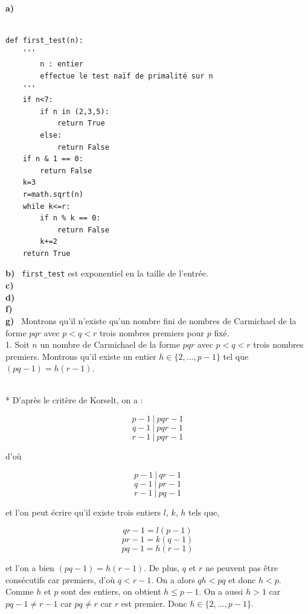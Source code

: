 \documentclass[a4paper]{article}
\newcommand{\question}[1]{\noindent \textbf{#1}~}
\newenvironment{myproof}[1][\proofname]{\proof[#1]\mbox{}\\*}{\endproof}
\begin{document}
\question{a)}
\begin{lstlisting}[frame=single]  % Start your code-block

def first_test(n):
    '''
        n : entier
        effectue le test naïf de primalité sur n
    '''
    if n<7:
        if n in (2,3,5):
            return True
        else:
            return False
    if n & 1 == 0:
        return False
    k=3
    r=math.sqrt(n)
    while k<=r:
        if n % k == 0:
            return False
        k+=2
    return True
\end{lstlisting}

\question{b)} \texttt{first\_test} est exponentiel en la taille de l'entrée.\\

\question{c)} \\
\question{d)} \\
\question{f)} \\

\question{g)} Montrons qu'il n'existe qu'un nombre fini de nombres de Carmichael
de la forme $pqr$ avec $p < q < r$ trois nombres premiers pour $p$ fixé. \\

1. Soit $n$ un nombre de Carmichael de la forme $pqr$ avec $p < q < r$ trois
nombres premiers. Montrons qu'il existe un entier $h \in \{2,...,p-1\}$ tel que
$(pq - 1) = h(r - 1)$.

\begin{myproof}
D'après le critère de Korselt, on a :

$$ p-1\ |\ pqr-1$$
$$ q-1\ |\ pqr-1$$
$$ r-1\ |\ pqr-1$$

d'où 

$$ p-1\ |\ qr-1 $$
$$ q-1\ |\ pr-1 $$ 
$$ r-1\ |\ pq-1 $$

et l'on peut écrire qu'il existe trois entiers $l$, $k$, $h$ tels que,

\begin{equation} qr-1 = l(p-1)\label{eq:div_p}\end{equation}
\begin{equation} pr-1 = k(q-1)\label{eq:div_q}\end{equation}
\begin{equation} pq-1 = h(r-1)\label{eq:div_r}\end{equation}

et l'on a bien $(pq-1) = h(r-1)$. De plus, $q$ et $r$ ne peuvent pas être
consécutifs car premiers, d'où $q < r-1$. On a alors $qh < pq$ et donc $h <
p$. Comme $h$ et $p$ sont des entiers, on obtient $h \leq p-1$. On a aussi
$h > 1$ car $pq - 1 \neq r - 1$ car $pq \neq r$ car $r$ est premier. Donc $h
\in \{2,...,p-1\}$.\\

\end{myproof}
\end{document}

